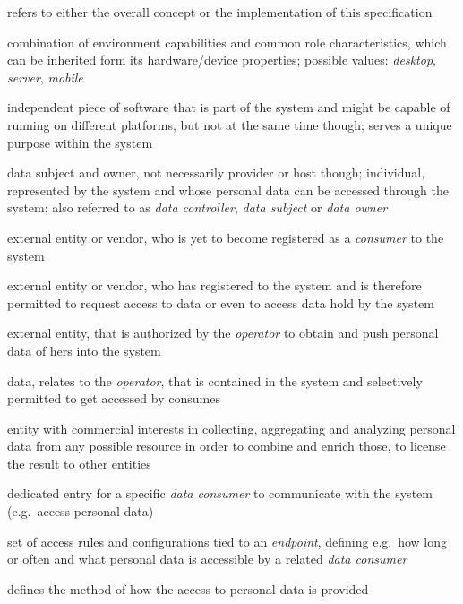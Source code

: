 \documentclass[12pt,english,a4paper,titlepage,cleardoublepage=empty,dottedtoc]{report}
\providecommand{\tightlist}{%
  \setlength{\itemsep}{0pt}\setlength{\parskip}{0pt}}
\begin{document}
\begin{description}
\tightlist
\item[\protect\hypertarget{spec_term_system}{}{(The) System}:]
refers to either the overall concept or the implementation of this
specification
\item[\protect\hypertarget{spec_term_platform}{}{Platform}:]
combination of environment capabilities and common role characteristics,
which can be inherited form its hardware/device properties; possible
values: \emph{desktop}, \emph{server}, \emph{mobile}
\item[\protect\hypertarget{spec_term_component}{}{Component}:]
independent piece of software that is part of the system and might be
capable of running on different platforms, but not at the same time
though; serves a unique purpose within the system
\item[\protect\hypertarget{spec_term_operator}{}{Operator}:]
data subject and owner, not necessarily provider or host though;
individual, represented by the system and whose personal data can be
accessed through the system; also referred to as \emph{data controller},
\emph{data subject} or \emph{data owner}
\item[\protect\hypertarget{spec_term_third-party}{}{Third Party}:]
external entity or vendor, who is yet to become registered as a
\emph{consumer} to the system
\item[\protect\hypertarget{spec_term_consumer}{}{(Data) Consumer}:]
external entity or vendor, who has registered to the system and is
therefore permitted to request access to data or even to access data
hold by the system
\item[\protect\hypertarget{spec_term_contributor}{}{(Data)
Contributor}:]
external entity, that is authorized by the \emph{operator} to obtain and
push personal data of hers into the system
\item[\protect\hypertarget{spec_term_personal-data}{}{Personal Data}:]
data, relates to the \emph{operator}, that is contained in the system
and selectively permitted to get accessed by consumes
\item[\protect\hypertarget{spec_term_data-broker}{}{Data Broker}:]
entity with commercial interests in collecting, aggregating and
analyzing personal data from any possible resource in order to combine
and enrich those, to license the result to other entities
\item[\protect\hypertarget{spec_term_endpoint}{}{Endpoint}:]
dedicated entry for a specific \emph{data consumer} to communicate with
the system (e.g.~access personal data)
\item[\protect\hypertarget{spec_term_permission-profile}{}{Permission
Profile}:]
set of access rules and configurations tied to an \emph{endpoint},
defining e.g.~how long or often and what personal data is accessible by
a related \emph{data consumer}
\item[\protect\hypertarget{spec_term_access-type}{}{Access Type}:]
defines the method of how the access to personal data is provided
\end{description}
\end{document}
